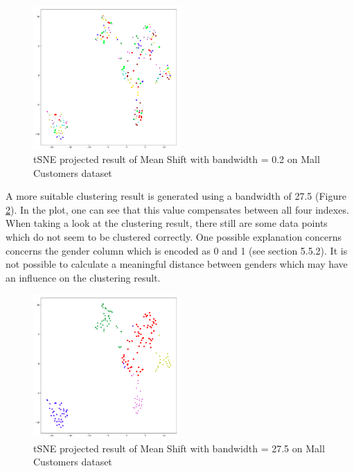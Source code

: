 \begin{figure}[!ht]
\caption{tSNE projected result of Mean Shift with bandwidth = 0.2 on Mall Customers dataset}
\begin{center}
\includegraphics[width=0.5\textwidth]{images/Meanshift_Mall_4_6.png}
\end{center}
\label{fig:meanshift_mall_4_6}
\end{figure}

A more suitable clustering result is generated using a bandwidth of 27.5 (Figure \ref{fig:meanshift_mall_27}). In the plot, one can see that this value compensates between all four indexes.
When taking a look at the clustering result, there still are some data points which do not seem to be clustered correctly. One possible explanation concerns concerns the gender column which is encoded as 0 and 1 (see section 5.5.2). It is not possible to calculate a meaningful distance between genders which may have an influence on the clustering result. 

\begin{figure}[!ht]
\caption{tSNE projected result of Mean Shift with bandwidth = 27.5 on Mall Customers dataset}
\begin{center}
\includegraphics[width=0.5\textwidth]{images/Meanshift_Mall_27_5.png}
\end{center}
\label{fig:meanshift_mall_27}
\end{figure}

